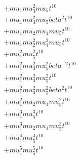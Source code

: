 \begin{align*}
  + mu_1 mu_3^{2} mu_5 t^{10} \\
  + mu_1 mu_3^{2} mu_5 beta^{2} t^{10} \\
  + mu_1 mu_2 mu_4 mu_5 t^{10} \\
  + mu_1 mu_2^{2} mu_4^{2} mu_5 t^{10} \\
  + mu_1^{2} mu_5^{2} t^{10} \\
  + mu_1^{2} mu_3^{2} mu_5^{2} beta^{-2} t^{10} \\
  + mu_1^{2} mu_3^{2} mu_5^{2} t^{10} \\
  + mu_1^{2} mu_3^{2} mu_5^{2} beta^{2} t^{10} \\
  + mu_1^{2} mu_2 mu_4 mu_5^{2} t^{10} \\
  + mu_1^{3} mu_5^{3} t^{10} \\
  + mu_1^{3} mu_2 mu_4 mu_5^{3} t^{10} \\
  + mu_1^{4} mu_5^{4} t^{10} \\
  + mu_1^{5} mu_5^{5} t^{10}
\end{align*}
